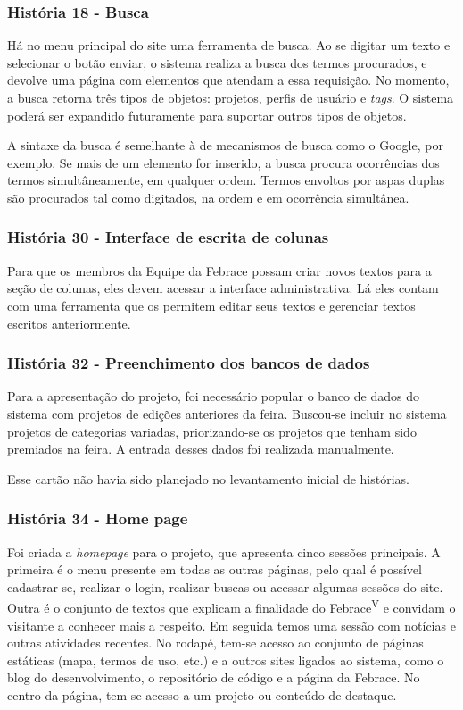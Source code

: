 \documentclass[a4paper,12pt,font=plain,header=plain]{abnt}
\begin{document}
    \subsubsection{História 18 - Busca}
      Há no menu principal do site uma ferramenta de busca. Ao se digitar um texto e selecionar o botão enviar, o sistema realiza a busca dos termos procurados, e devolve uma página com elementos que atendam a essa requisição. No momento, a busca retorna três tipos de objetos: projetos, perfis de usuário e \textit{tags}. O sistema poderá ser expandido futuramente para suportar outros tipos de objetos.

      A sintaxe da busca é semelhante à de mecanismos de busca como o Google, por exemplo. Se mais de um elemento for inserido, a busca procura ocorrências dos termos simultâneamente, em qualquer ordem. Termos envoltos por aspas duplas são procurados tal como digitados, na ordem e em ocorrência simultânea.

    \subsubsection{História 30 - Interface de escrita de colunas}
      Para que os membros da Equipe da Febrace possam criar novos textos para a seção de colunas, eles devem acessar a interface administrativa. Lá eles contam com uma ferramenta que os permitem editar seus textos e gerenciar textos escritos anteriormente.

    \subsubsection{História 32 - Preenchimento dos bancos de dados}
      Para a apresentação do projeto, foi necessário popular o banco de dados do sistema com projetos de edições anteriores da feira. Buscou-se incluir no sistema projetos de categorias variadas, priorizando-se os projetos que tenham sido premiados na feira. A entrada desses dados foi realizada manualmente.

  Esse cartão não havia sido planejado no levantamento inicial de histórias.

    \subsubsection{História 34 - Home page}
      Foi criada a \textit{homepage} para o projeto, que apresenta cinco sessões principais. A primeira é o menu presente em todas as outras páginas, pelo qual é possível cadastrar-se, realizar o login, realizar buscas ou acessar algumas sessões do site. Outra é o conjunto de textos que explicam a finalidade do Febrace\textsuperscript{V} e convidam o visitante a conhecer mais a respeito. Em seguida temos uma sessão com notícias e outras atividades recentes. No rodapé, tem-se acesso ao conjunto de páginas estáticas (mapa, termos de uso, etc.) e a outros sites ligados ao sistema, como o blog do desenvolvimento, o repositório de código e a página da Febrace. No centro da página, tem-se acesso a um projeto ou conteúdo de destaque.
\end{document}

